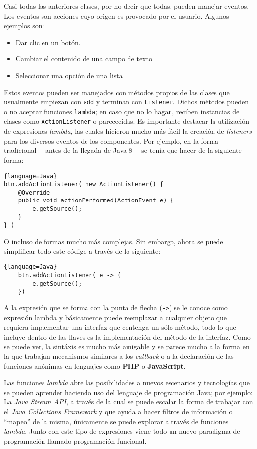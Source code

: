 Casi todas las anteriores clases, por no decir que todas, pueden manejar eventos. Los eventos son acciones cuyo origen es provocado
por el usuario. Algunos ejemplos son:

\begin{itemize}
    \item Dar clic en un botón.
    \item Cambiar el contenido de una campo de texto
    \item Seleccionar una opción de una lista
\end{itemize}

Estos eventos pueden ser manejados con métodos propios de las clases que usualmente empiezan con \texttt{add} y terminan con
\texttt{Listener}. Dichos métodos pueden o no aceptar funciones \texttt{lambda}; en caso que no lo hagan, reciben instancias de clases
como \texttt{ActionListener} o parececidas. Es importante destacar la utilización de expresiones \textit{lambda}, las cuales hicieron 
mucho más fácil la creación de \textit{listeners} para los diversos eventos de los componentes. Por ejemplo, en la forma tradicional 
---antes de la llegada de Java 8--- se tenía que hacer de la siguiente forma:

\begin{lstlisting}{language=Java}
btn.addActionListener( new ActionListener() {
    @Override
    public void actionPerformed(ActionEvent e) {
        e.getSource();
    }
} )
\end{lstlisting}

O incluso de formas mucho más complejas. Sin embargo, ahora se puede simplificar todo este código a través de lo siguiente:

\begin{lstlisting}{language=Java}
    btn.addActionListener( e -> {
        e.getSource();
    }) 
\end{lstlisting}

A la expresión que se forma con la punta de flecha (\texttt{->}) se le conoce como expresión lambda y básicamente puede 
reemplazar a cualquier objeto que requiera implementar una interfaz que contenga un sólo método, todo lo que incluye dentro 
de las llaves es la implementación del método de la interfaz. Como se puede ver, la sintáxis es mucho más amigable y se parece 
mucho a la forma en la que trabajan mecanismos similares a los \textit{callback} o a la declaración de las funciones anónimas 
en lenguajes como \textbf{PHP} o \textbf{JavaScript}.

Las funciones \textit{lambda} abre las posibilidades a nuevos escenarios y tecnologías que se pueden aprender haciendo uso del 
lenguaje de programación Java; por ejemplo: La \textit{Java Stream API}, a través de la cual se puede escalar la forma de trabajar 
con el \textit{Java Collections Framework} y que ayuda a hacer filtros de información o ``mapeo'' de la misma, únicamente se puede 
explorar a través de funciones \textit{lambda}. Junto con este tipo de expresiones viene todo un nuevo paradigma de programación llamado 
programación funcional.

